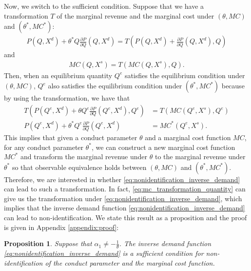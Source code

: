 \documentclass[11pt, a4paper]{article}
\newtheorem{proposition}{Proposition}
\theoremstyle{remark}
\begin{document}
Now, we switch to the sufficient condition.
Suppose that we have a transformation $T$ of the marginal revenue and the marginal cost under $(\theta, MC)$ and $(\theta^{*}, MC^{*})$:
\begin{align}
    P(Q, X^{d}) + \theta^{*} Q \frac{\partial P}{\partial Q}(Q, X^{d}) = T\left(P(Q, X^{d}) + \frac{\partial P}{\partial Q}(Q, X^{d}), Q\right)
\end{align}
and
\begin{align}
    MC(Q, X^{s}) = T\left(MC(Q, X^{s}), Q\right).
\end{align}
Then, when an equilibrium quantity $Q^e$ satisfies the equilibrium condition under $(\theta, MC)$, $Q^e$ also satisfies the equilibrium condition under $(\theta^{*}, MC^{*})$ because by using the transformation, we have that
\begin{align}
    T\left(P(Q^e, X^{d}) + \theta Q^e \frac{\partial P}{\partial Q}(Q^e, X^{d}), Q^e\right)&= T\left(MC(Q^e, X^{s}), Q^e\right)\\
    P(Q^e, X^{d}) + \theta^{*} Q^e \frac{\partial P}{\partial Q}(Q^e, X^{d})&= MC^{*}(Q^e, X^{s}).
\end{align}
This implies that given a conduct parameter $\theta$ and a marginal cost function $MC$, for any conduct parameter $\theta^{*}$, we can construct a new marginal cost function $MC^{*}$ and transform the marginal revenue under $\theta$ to the marginal revenue under $\theta^{*}$ so that observable equivalence holds between $(\theta, MC)$ and $(\theta^{*}, MC^{*})$.
Therefore, we are interested in whether \eqref{eq:nonidentification_inverse_demand} can lead to such a transformation.
In fact, \eqref{eq:mc_transformation_quantity} can give us the transformation under \eqref{eq:nonidentification_inverse_demand}, which implies that the inverse demand function \eqref{eq:nonidentification_inverse_demand} can lead to non-identification.
We state this result as a proposition and the proof is given in Appendix \ref{appendix:proof}:
\begin{proposition}\label{proposition:sufficient_nonidentification}
    Suppose that $\alpha_1 \ne -\frac{1}{\theta}$. The inverse demand function \eqref{eq:nonidentification_inverse_demand} is a sufficient condition for non-identification of the conduct parameter and the marginal cost function.
\end{proposition}
\end{document}
